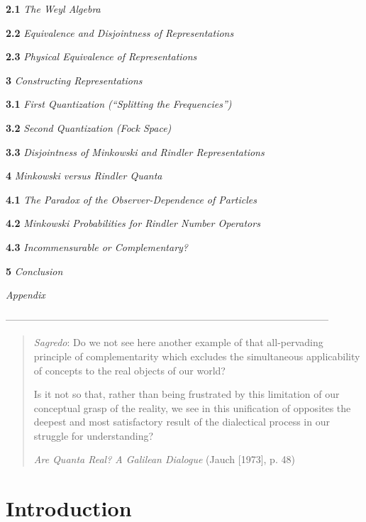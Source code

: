 \documentclass[12pt]{article}
\theoremstyle{remark}
\theoremstyle{definition}
\begin{document}
\textbf{2.1} \textit{The Weyl 
Algebra}

\textbf{2.2} \textit{Equivalence and Disjointness of Representations}

\textbf{2.3} \textit{Physical Equivalence of Representations}

\noindent \textbf{3} \textit{Constructing Representations}

\textbf{3.1} \textit{First Quantization (``Splitting the Frequencies'')}

\textbf{3.2} \textit{Second Quantization (Fock Space)}

\textbf{3.3} \textit{Disjointness of Minkowski and Rindler 
Representations}

\noindent \textbf{4} \textit{Minkowski versus Rindler Quanta}

\textbf{4.1} \textit{The Paradox of the Observer-Dependence of 
Particles}

\textbf{4.2} \textit{Minkowski Probabilities for Rindler Number 
Operators}

\textbf{4.3} \textit{Incommensurable or Complementary?}

\noindent \textbf{5} \textit{Conclusion}

\noindent \textit{Appendix}

\noindent --------------------------------------------------------------------------------------------------
\vspace{.1in}
\newpage

\begin{quote} 
\emph{Sagredo}: Do we not see here another example of 
    that all-pervading principle of complementarity which excludes the
    simultaneous applicability of concepts to the real objects of our
    world?
    
    Is it not so that, rather than being frustrated by this 
    limitation of our conceptual grasp of the reality, we see in this 
    unification of opposites the deepest and most satisfactory result 
    of the dialectical process in our struggle for understanding? 
    
    \textit{Are Quanta Real? A Galilean Dialogue} (Jauch [1973], p. 
    48)
\end{quote}

\section{Introduction}
\end{document}
